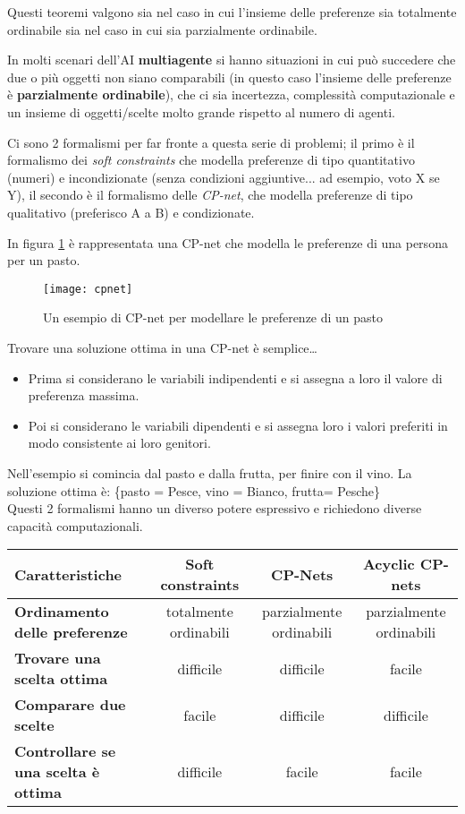Questi teoremi valgono sia nel caso in cui l'insieme delle preferenze sia
totalmente ordinabile sia nel caso in cui sia parzialmente ordinabile.

In molti scenari dell'AI \textbf{multiagente} si hanno situazioni in cui
può succedere che due o più oggetti non siano comparabili (in questo caso
l'insieme delle preferenze è \textbf{parzialmente ordinabile}), che ci sia
incertezza, complessità computazionale e un insieme di oggetti/scelte molto
grande rispetto al numero di agenti.

Ci sono 2 formalismi per far fronte a questa serie di problemi; il primo
è il formalismo dei \textit{soft constraints} che modella preferenze di
tipo quantitativo (numeri) e incondizionate (senza condizioni aggiuntive... ad
esempio, voto X se Y), il secondo è il formalismo delle \textit{CP-net}, che
modella preferenze di tipo qualitativo (preferisco A a B) e condizionate.

In figura \ref{fig:cpnet} è rappresentata una CP-net che modella le preferenze
di una persona per un pasto.

\begin{figure}[H]
\centering
\texttt{[image: cpnet]}
\caption{Un esempio di CP-net per modellare le preferenze di un
pasto}
\label{fig:cpnet}
\end{figure}

Trovare una soluzione ottima in una CP-net è semplice\dots

\begin{itemize}
 \item Prima si considerano le variabili indipendenti e si assegna
a loro il valore di preferenza massima.
 \item Poi si considerano le variabili dipendenti e si assegna loro
i valori preferiti in modo consistente ai loro genitori.
\end{itemize}

Nell'esempio si comincia dal pasto e dalla frutta, per finire con
il vino. La soluzione ottima è: \{pasto = Pesce, vino = Bianco,
frutta= Pesche\}\\

Questi 2 formalismi hanno un diverso potere espressivo e richiedono
diverse capacità computazionali.

\begin{table}[H]
\begin{tabular}{|p{3.5cm}|c|c|c|}
\hline
\textbf{Caratteristiche} & \textbf{Soft constraints} & \textbf{CP-Nets} &
\textbf{Acyclic CP-nets} \\ \hline
\textbf{Ordinamento delle preferenze} & totalmente ordinabili & parzialmente
ordinabili & parzialmente ordinabili \\ \hline
\textbf{Trovare una scelta ottima} & difficile & difficile & facile \\ \hline
\textbf{Comparare due scelte} & facile & difficile & difficile \\ \hline
\textbf{Controllare se una scelta è ottima} & difficile & facile & facile \\
\hline
\end{tabular}
\end{table}
